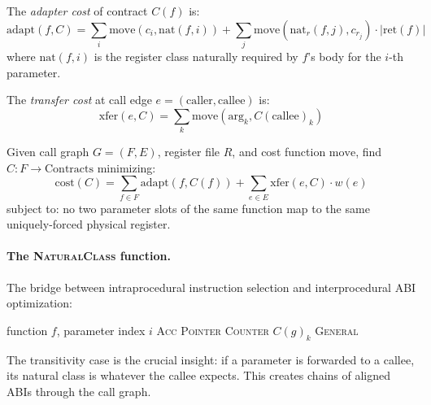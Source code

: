 \documentclass[sigplan,screen,nonacm]{acmart}
\begin{document}
\begin{definition}
The \emph{adapter cost} of contract $C(f)$ is:
\begin{equation}
\text{adapt}(f, C) = \sum_{i} \text{move}(c_i, \text{nat}(f,i))
  + \sum_{j} \text{move}(\text{nat}_r(f,j), c_{r_j}) \cdot |\text{ret}(f)|
\end{equation}
where $\text{nat}(f,i)$ is the register class naturally required by $f$'s
body for the $i$-th parameter.
\end{definition}

\begin{definition}
The \emph{transfer cost} at call edge $e = (\text{caller}, \text{callee})$
is:
\begin{equation}
\text{xfer}(e, C) = \sum_{k} \text{move}(\text{arg}_k, C(\text{callee})_k)
\end{equation}
\end{definition}

\begin{definition}[PFCCO]
Given call graph $G=(F,E)$, register file $R$, and cost function
$\text{move}$, find $C: F \to \text{Contracts}$ minimizing:
\begin{equation}
\text{cost}(C) = \sum_{f \in F} \text{adapt}(f, C(f))
  + \sum_{e \in E} \text{xfer}(e, C) \cdot w(e)
\label{eq:total-cost}
\end{equation}
subject to: no two parameter slots of the same function map to the same
uniquely-forced physical register.
\end{definition}

\paragraph{The \textsc{NaturalClass} function.}
The bridge between intraprocedural instruction selection and interprocedural
ABI optimization:

\begin{algorithmic}[1]
\REQUIRE function $f$, parameter index $i$
    \RETURN \textsc{Acc}
    \RETURN \textsc{Pointer}
    \RETURN \textsc{Counter}
    \RETURN $C(g)_k$ 
  \ENDIF
\ENDFOR
\RETURN \textsc{General}
\end{algorithmic}

The transitivity case is the crucial insight: if a parameter is forwarded to
a callee, its natural class is whatever the callee expects.  This creates
chains of aligned ABIs through the call graph.
\end{document}
